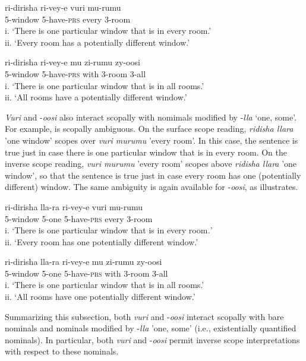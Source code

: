 \documentclass[output=paper]{langsci/langscibook}
\begin{document}
\ea 
\gll ri-dirisha  ri-vey-e  vuri  mu-rumu  \\
     5-window  5-have-\textsc{prs}  every  3-room\\
\glt i. ‘There is one particular window that is in every room.’  \\
ii. ‘Every room has a potentially different window.’  
\z

\ea
\gll ri-dirisha  ri-vey-e  mu  zi-rumu  zy-oosi\\
     5-window  5-have-\textsc{prs}  with  3-room  3-all\\
\glt i. ‘There is one particular window that is in all rooms.’ \\
ii. ‘All rooms have a potentially different window.’        
\z

  \textit{Vuri} and -\textit{oosi} also interact scopally with nomimals modified by -\textit{lla} ‘one, some’. For example,  is scopally ambiguous. On the surface scope reading, \textit{ridisha llara} 'one window' scopes over \textit{vuri murumu} 'every room'. In this case, the sentence is true just in case there is one particular window that is in every room. On the inverse scope reading, \textit{vuri murumu} 'every room' scopes above \textit{ridisha llara} 'one window', so that the sentence is true just in case every room has one (potentially different) window. The same ambiguity is again available for -\textit{oosi}, as  illustrates.

\ea 
\gll ri-dirisha     lla-ra  ri-vey-e  vuri  mu-rumu  \\
     5-window   5-one  5-have-\textsc{prs}  every  3-room\\
\glt i. ‘There is one particular window that is in every room\textit{.}’\textit{}  \\
ii. ‘Every room has one potentially different window.’       \textit{} 
\z

\ea
\gll ri-dirisha   lla-ra   ri-vey-e         mu     zi-rumu  zy-oosi\\
     5-window  5-one   5-have-\textsc{prs}    with   3-room  3-all\\
\glt i. ‘There is one particular window that is in all rooms.’\textit{} \\
ii. ‘All rooms have one potentially different window.’    \textsc{}  
\z

  Summarizing this subsection, both \textit{vuri} and -\textit{oosi} interact scopally with bare nominals and nominals modified by -\textit{lla} 'one, some' (i.e., existentially quantified nominals). In particular, both \textit{vuri} and -\textit{oosi} permit inverse scope interpretations with respect to these nominals.
\end{document}
